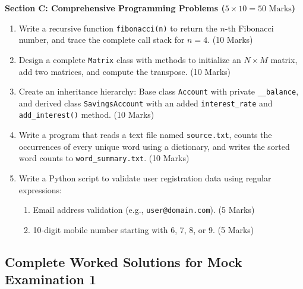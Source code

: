 \begin{mockexam}
\medskip
\noindent\textbf{Section C: Comprehensive Programming Problems ($5 \times 10 = 50\text{ Marks}$)}
\begin{enumerate}[leftmargin=1.5em, start=17]
    \item Write a recursive function \texttt{fibonacci(n)} to return the $n$-th Fibonacci number, and trace the complete call stack for $n=4$. (10 Marks)
    \item Design a complete \texttt{Matrix} class with methods to initialize an $N \times M$ matrix, add two matrices, and compute the transpose. (10 Marks)
    \item Create an inheritance hierarchy: Base class \texttt{Account} with private \texttt{\_\_balance}, and derived class \texttt{SavingsAccount} with an added \texttt{interest\_rate} and \texttt{add\_interest()} method. (10 Marks)
    \item Write a program that reads a text file named \texttt{source.txt}, counts the occurrences of every unique word using a dictionary, and writes the sorted word counts to \texttt{word\_summary.txt}. (10 Marks)
    \item Write a Python script to validate user registration data using regular expressions:
    \begin{enumerate}[label=(\alph*)]
        \item Email address validation (e.g., \texttt{user@domain.com}). (5 Marks)
        \item 10-digit mobile number starting with 6, 7, 8, or 9. (5 Marks)
    \end{enumerate}
\end{enumerate}
\end{mockexam}

\subsection{Complete Worked Solutions for Mock Examination 1}

